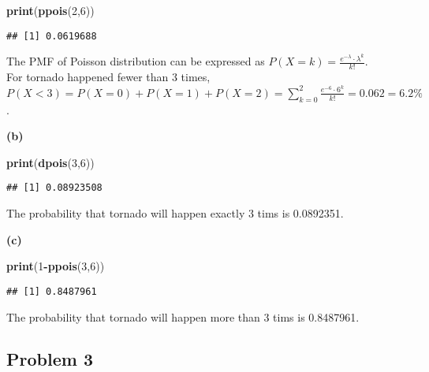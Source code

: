 \documentclass[
]{article}
\newenvironment{Shaded}{\begin{snugshade}}{\end{snugshade}}
\newcommand{\DecValTok}[1]{\textcolor[rgb]{0.00,0.00,0.81}{#1}}
\newcommand{\FunctionTok}[1]{\textcolor[rgb]{0.13,0.29,0.53}{\textbf{#1}}}
\newcommand{\NormalTok}[1]{#1}
\newcommand{\SpecialCharTok}[1]{\textcolor[rgb]{0.81,0.36,0.00}{\textbf{#1}}}
\begin{document}
\begin{Shaded}
\begin{Highlighting}[]
\FunctionTok{print}\NormalTok{(}\FunctionTok{ppois}\NormalTok{(}\DecValTok{2}\NormalTok{,}\DecValTok{6}\NormalTok{))}
\end{Highlighting}
\end{Shaded}

\begin{verbatim}
## [1] 0.0619688
\end{verbatim}

The PMF of Poisson distribution can be expressed as
\(P(X = k) = \frac{e^{-\lambda} \cdot \lambda^k}{k!}\).\\
For tornado happened fewer than 3 times,
\(P(X < 3) = P(X = 0) + P(X = 1) + P(X = 2) = \sum_{k=0}^{2}\frac{e^{-6} \cdot 6^k}{k!} = 0.062 = 6.2\%\).

\textbf{(b)}

\begin{Shaded}
\begin{Highlighting}[]
\FunctionTok{print}\NormalTok{(}\FunctionTok{dpois}\NormalTok{(}\DecValTok{3}\NormalTok{,}\DecValTok{6}\NormalTok{))}
\end{Highlighting}
\end{Shaded}

\begin{verbatim}
## [1] 0.08923508
\end{verbatim}

The probability that tornado will happen exactly 3 tims is 0.0892351.

\textbf{(c)}

\begin{Shaded}
\begin{Highlighting}[]
\FunctionTok{print}\NormalTok{(}\DecValTok{1}\SpecialCharTok{{-}}\FunctionTok{ppois}\NormalTok{(}\DecValTok{3}\NormalTok{,}\DecValTok{6}\NormalTok{))}
\end{Highlighting}
\end{Shaded}

\begin{verbatim}
## [1] 0.8487961
\end{verbatim}

The probability that tornado will happen more than 3 tims is 0.8487961.

\hypertarget{problem-3}{%
\subsection{Problem 3}\label{problem-3}}
\end{document}
